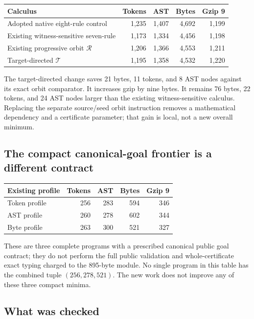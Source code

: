 \documentclass[11pt,a4paper]{article}
\theoremstyle{definition}\newtheorem{definition}[theorem]{Definition}
\begin{document}
\begin{center}\small
\begin{tabular}{lrrrr}
\toprule
Calculus & Tokens & AST & Bytes & Gzip 9\\
\midrule
Adopted native eight-rule control & 1,235 & 1,407 & 4,692 & 1,199\\
Existing witness-sensitive seven-rule & 1,173 & 1,334 & 4,456 & 1,198\\
Existing progressive orbit $\mathcal R$ & 1,206 & 1,366 & 4,553 & 1,211\\
Target-directed $\mathcal T$ & 1,195 & 1,358 & 4,532 & 1,220\\
\bottomrule
\end{tabular}
\end{center}
The target-directed change saves 21 bytes, 11 tokens, and 8 AST nodes
against its exact orbit comparator. It increases gzip by nine bytes.
It remains 76 bytes, 22 tokens, and 24 AST nodes larger than the existing
witness-sensitive calculus. Replacing the separate source/seed orbit
instruction removes a mathematical dependency and a certificate parameter;
that gain is local, not a new overall minimum.

\subsection{The compact canonical-goal frontier is a different contract}

\begin{center}\small
\begin{tabular}{lrrrr}
\toprule
Existing profile & Tokens & AST & Bytes & Gzip 9\\
\midrule
Token profile & 256 & 283 & 594 & 346\\
AST profile & 260 & 278 & 602 & 344\\
Byte profile & 263 & 300 & 521 & 327\\
\bottomrule
\end{tabular}
\end{center}
These are three complete programs with a prescribed canonical public
goal contract; they do not perform the full public validation and
whole-certificate exact typing charged to the 895-byte module. No
single program in this table has the combined tuple $(256,278,521)$.
The new work does not improve any of these three compact minima.

\subsection{What was checked}
\end{document}
